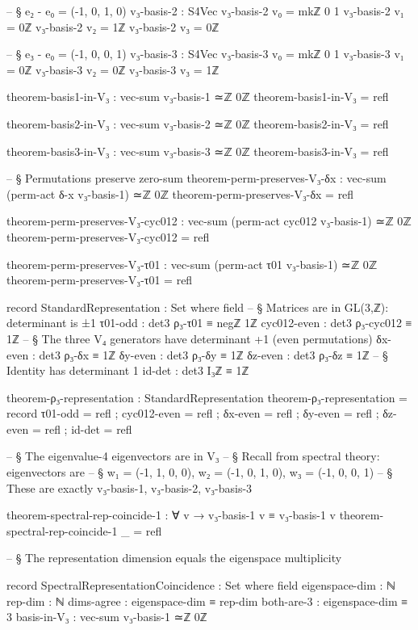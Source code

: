 \documentclass[11pt,a4paper]{book}
\begin{document}
\begin{code}
-- § e₂ - e₀ = (-1, 0, 1, 0)
v₃-basis-2 : S4Vec
v₃-basis-2 v₀ = mkℤ 0 1
v₃-basis-2 v₁ = 0ℤ
v₃-basis-2 v₂ = 1ℤ
v₃-basis-2 v₃ = 0ℤ

-- § e₃ - e₀ = (-1, 0, 0, 1)
v₃-basis-3 : S4Vec
v₃-basis-3 v₀ = mkℤ 0 1
v₃-basis-3 v₁ = 0ℤ
v₃-basis-3 v₂ = 0ℤ
v₃-basis-3 v₃ = 1ℤ

theorem-basis1-in-V₃ : vec-sum v₃-basis-1 ≃ℤ 0ℤ
theorem-basis1-in-V₃ = refl

theorem-basis2-in-V₃ : vec-sum v₃-basis-2 ≃ℤ 0ℤ
theorem-basis2-in-V₃ = refl

theorem-basis3-in-V₃ : vec-sum v₃-basis-3 ≃ℤ 0ℤ
theorem-basis3-in-V₃ = refl

-- § Permutations preserve zero-sum
theorem-perm-preserves-V₃-δx : vec-sum (perm-act δ-x v₃-basis-1) ≃ℤ 0ℤ
theorem-perm-preserves-V₃-δx = refl

theorem-perm-preserves-V₃-cyc012 : vec-sum (perm-act cyc012 v₃-basis-1) ≃ℤ 0ℤ
theorem-perm-preserves-V₃-cyc012 = refl

theorem-perm-preserves-V₃-τ01 : vec-sum (perm-act τ01 v₃-basis-1) ≃ℤ 0ℤ
theorem-perm-preserves-V₃-τ01 = refl

record StandardRepresentation : Set where
  field
    -- § Matrices are in GL(3,ℤ): determinant is ±1
    τ01-odd      : det3 ρ₃-τ01    ≡ negℤ 1ℤ
    cyc012-even  : det3 ρ₃-cyc012 ≡ 1ℤ
    -- § The three V₄ generators have determinant +1 (even permutations)
    δx-even      : det3 ρ₃-δx     ≡ 1ℤ
    δy-even      : det3 ρ₃-δy     ≡ 1ℤ
    δz-even      : det3 ρ₃-δz     ≡ 1ℤ
    -- § Identity has determinant 1
    id-det       : det3 I₃ℤ       ≡ 1ℤ

theorem-ρ₃-representation : StandardRepresentation
theorem-ρ₃-representation = record
  { τ01-odd     = refl
  ; cyc012-even = refl
  ; δx-even     = refl
  ; δy-even     = refl
  ; δz-even     = refl
  ; id-det      = refl
  }

-- § The eigenvalue-4 eigenvectors are in V₃
-- § Recall from spectral theory: eigenvectors are 
-- § w₁ = (-1, 1, 0, 0), w₂ = (-1, 0, 1, 0), w₃ = (-1, 0, 0, 1)
-- § These are exactly v₃-basis-1, v₃-basis-2, v₃-basis-3

theorem-spectral-rep-coincide-1 : ∀ v → v₃-basis-1 v ≡ v₃-basis-1 v
theorem-spectral-rep-coincide-1 _ = refl

-- § The representation dimension equals the eigenspace multiplicity

record SpectralRepresentationCoincidence : Set where
  field
    eigenspace-dim : ℕ
    rep-dim        : ℕ
    dims-agree     : eigenspace-dim ≡ rep-dim
    both-are-3     : eigenspace-dim ≡ 3
    basis-in-V₃    : vec-sum v₃-basis-1 ≃ℤ 0ℤ


\end{code}
\end{document}
